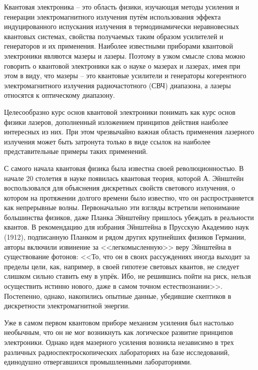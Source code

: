 
Квантовая электроника -- это область физики, изучающая методы усиления 
и генерации электромагнитного излучения путём использования эффекта 
индуцированного испускания излучения в термодинамически неравновесных 
квантовых системах, свойства получаемых таким образом усилителей и 
генераторов и их применения. Наиболее известными приборами квантовой 
электроники являются мазеры и лазеры. Поэтому в узком смысле слова можно 
говорить о квантовой электроники как о науке о мазерах и лазерах, имея при 
этом в виду, что мазеры -- это квантовые усилители и генераторы когерентного 
электромагнитного излучения радиочастотного (СВЧ) диапазона, а лазеры 
относятся к оптическому диапазону.

Целесообразно курс основ квантовой электроники понимать как курс основ физики 
лазеров, дополненный изложением принципов действия наиболее интересных из 
них. При этом чрезвычайно важная область применения лазерного излучения может 
быть затронута только в виде ссылок на наиболее представительные примеры таких 
применений. 

С самого начала квантовая физика была известна своей революционностью. В 
начале 20 столетия в науке появилась квантовая теория, которой А. Эйнштейн 
воспользовался для объяснения дискретных свойств светового излучения, о 
котором на протяжении долгого времени было известно, что он распространяется 
как непрерывные волны. Первоначально эти взгляды встретили непонимание 
большинства физиков, даже Планка Эйнштейну пришлось убеждать в реальности 
квантов. В рекомендацию для избрания Эйнштейна в Прусскую Академию наук 
(1912), подписанную Планком и рядом других крупнейших физиков Германии, 
авторы включили извинение за <<легкомысленную>> веру Эйнштейна в существование 
фотонов: <<То, что он в своих рассуждениях иногда выходит за пределы цели, 
как, например, в своей гипотезе световых квантов, не следует слишком сильно 
ставить ему в упрёк. Ибо, не решившись пойти на риск, нельзя осуществить 
истинно нового, даже в самом точном естествознании>>. Постепенно, однако, 
накопились опытные данные, убедившие скептиков в дискретности электромагнитной 
энергии.

Уже в самом первом квантовом приборе механизм усиления был настолько необычным, 
что он не мог возникнуть как логическое развитие принципов электроники. Однако 
идея мазерного усиления возникла независимо в трех различных 
радиоспектроскопических лабораториях на базе исследований, единодушно 
отвергавшихся промышленными лабораториями.

